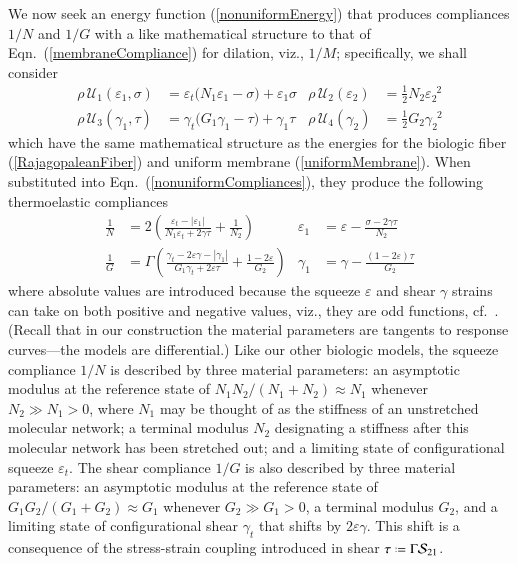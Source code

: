 We now seek an energy function (\ref{nonuniformEnergy}) that produces compliances $1/N$ and $1/G$ with a like mathematical structure to that of Eqn.~(\ref{membraneCompliance}) for dilation, viz., $1/M$; specifically, we shall consider
\begin{subequations}
    \label{nonuniformComplianceEnergies}
    \begin{align}
    \rho \, \mathcal{U}_1 ( \varepsilon_1 , \sigma ) & = \varepsilon_t \bigl( N_1 \varepsilon_1 - \sigma \bigr) + \varepsilon_1 \sigma &
    \rho \, \mathcal{U}_2 ( \varepsilon_2 ) & = \tfrac{1}{2} N_2 \varepsilon_2^{\phantom{2}2} 
    \label{squeezeEnergy} \\
    \rho \, \mathcal{U}_3 ( \gamma_1 , \tau ) & = \gamma_t \bigl( G_1 \gamma_1 - \tau \bigr) + \gamma_1 \tau &
    \rho \, \mathcal{U}_4 ( \gamma_2 ) & = \tfrac{1}{2} G_2 \gamma_2^{\phantom{2}2}
    \label{shearEnergy}
    \end{align}
\end{subequations}
which have the same mathematical structure as the energies for the biologic fiber (\ref{RajagopaleanFiber}) and uniform membrane (\ref{uniformMembrane}).  When substituted into Eqn.~(\ref{nonuniformCompliances}), they produce the following thermo\-elastic compliances
\begin{subequations}
    \label{nonuniformComplianceFns}
    \begin{align}
    \frac{1}{N} & = 2 \left( \frac{ \varepsilon_t - | \varepsilon_1 |}{N_1 \varepsilon_t + 2 \gamma \tau} + \frac{1}{N_2} \right) &
    \varepsilon_1 & = \varepsilon - \frac{\sigma - 2 \gamma \tau}{N_2}
    \label{squeezeCompliance2D} \\
    \frac{1}{G} & = \Gamma \left( \frac{\gamma_t - 2\varepsilon \gamma - | \gamma_1 |}{G_1 \gamma_t + 2 \varepsilon \tau} + \frac{1-2\varepsilon}{G_2} \right) & 
    \gamma_1 & = \gamma - \frac{(1 - 2\varepsilon) \tau}{G_2}
    \label{shearCompliance2D}
    \end{align}
\end{subequations}
where absolute values are introduced because the squeeze $\varepsilon$ and shear $\gamma$ strains can take on both positive and negative values, viz., they are odd functions, cf.\ \cite{Freedetal17}.  (Recall that in our construction the material parameters are tangents to response curves---the models are differential.)  Like our other biologic models, the squeeze compliance $1/N$ is described by three material parameters: an asymptotic modulus at the reference state of $N_1 N_2 / (N_1 + N_2) \approx N_1$ whenever $N_2 \gg N_1 > 0$, where $N_1$ may be thought of as the stiffness of an unstretched molecular network; a terminal modulus $N_2$ designating a stiffness after this molecular network has been stretched out; and a limiting state of configurational squeeze $\varepsilon_t$.  The shear compliance $1/G$ is also described by three material parameters: an asymptotic modulus at the reference state of $G_1 G_2 / ( G_1 + G_2 ) \approx G_1$ whenever $G_2 \gg G_1 > 0$, a terminal modulus $G_2$, and a limiting state of configurational shear $\gamma_t$ that shifts by $2\varepsilon\gamma$.  This shift is a consequence of the stress-strain coupling introduced in shear $\tau \defeq \Gamma \mathcal{S}_{21}$.